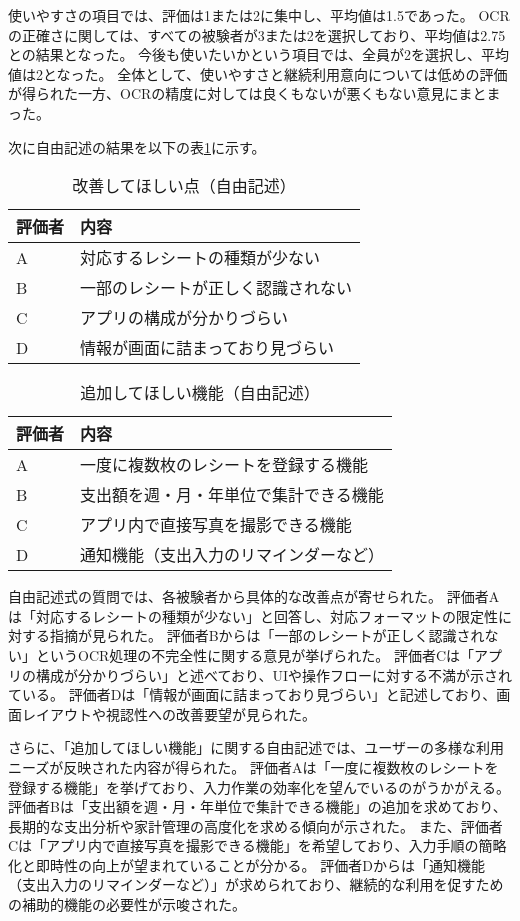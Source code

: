\documentclass[main]{subfiles}
\begin{document}
使いやすさの項目では、評価は1または2に集中し、平均値は1.5であった。
OCRの正確さに関しては、すべての被験者が3または2を選択しており、平均値は2.75との結果となった。
今後も使いたいかという項目では、全員が2を選択し、平均値は2となった。
全体として、使いやすさと継続利用意向については低めの評価が得られた一方、OCRの精度に対しては良くもないが悪くもない意見にまとまった。

次に自由記述の結果を以下の表\ref{tab:improvement_requests}に示す。
\begin{table}[htbp]
\centering
\caption{改善してほしい点（自由記述）}
\label{tab:improvement_requests}
\begin{tabular}{ll}
\hline
評価者 & 内容 \\
\hline
A & 対応するレシートの種類が少ない \\
B & 一部のレシートが正しく認識されない \\
C & アプリの構成が分かりづらい \\
D & 情報が画面に詰まっており見づらい \\
\hline
\end{tabular}
\end{table}


\begin{table}[htbp]
\centering
\caption{追加してほしい機能（自由記述）}
\label{tab:additional_features}
\begin{tabular}{ll}
\hline
評価者 & 内容 \\
\hline
A & 一度に複数枚のレシートを登録する機能 \\
B & 支出額を週・月・年単位で集計できる機能 \\
C & アプリ内で直接写真を撮影できる機能 \\
D & 通知機能（支出入力のリマインダーなど） \\
\hline
\end{tabular}
\end{table}

自由記述式の質問では、各被験者から具体的な改善点が寄せられた。
評価者Aは「対応するレシートの種類が少ない」と回答し、対応フォーマットの限定性に対する指摘が見られた。
評価者Bからは「一部のレシートが正しく認識されない」というOCR処理の不完全性に関する意見が挙げられた。
評価者Cは「アプリの構成が分かりづらい」と述べており、UIや操作フローに対する不満が示されている。
評価者Dは「情報が画面に詰まっており見づらい」と記述しており、画面レイアウトや視認性への改善要望が見られた。

さらに、「追加してほしい機能」に関する自由記述では、ユーザーの多様な利用ニーズが反映された内容が得られた。
評価者Aは「一度に複数枚のレシートを登録する機能」を挙げており、入力作業の効率化を望んでいるのがうかがえる。
評価者Bは「支出額を週・月・年単位で集計できる機能」の追加を求めており、長期的な支出分析や家計管理の高度化を求める傾向が示された。
また、評価者Cは「アプリ内で直接写真を撮影できる機能」を希望しており、入力手順の簡略化と即時性の向上が望まれていることが分かる。
評価者Dからは「通知機能（支出入力のリマインダーなど）」が求められており、継続的な利用を促すための補助的機能の必要性が示唆された。
\end{document}
